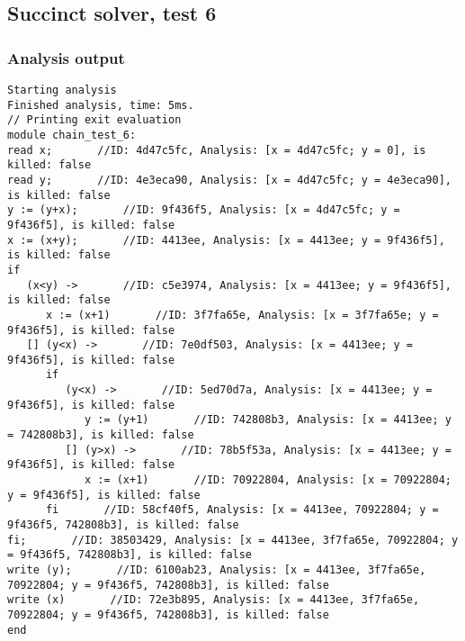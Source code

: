\documentclass{report}
\begin{document}
\subsection{Succinct solver, test 6}
\subsubsection{Analysis output}
\begin{lstlisting}
Starting analysis
Finished analysis, time: 5ms.
// Printing exit evaluation
module chain_test_6:
read x;       //ID: 4d47c5fc, Analysis: [x = 4d47c5fc; y = 0], is killed: false
read y;       //ID: 4e3eca90, Analysis: [x = 4d47c5fc; y = 4e3eca90], is killed: false
y := (y+x);       //ID: 9f436f5, Analysis: [x = 4d47c5fc; y = 9f436f5], is killed: false
x := (x+y);       //ID: 4413ee, Analysis: [x = 4413ee; y = 9f436f5], is killed: false
if
   (x<y) ->       //ID: c5e3974, Analysis: [x = 4413ee; y = 9f436f5], is killed: false
      x := (x+1)       //ID: 3f7fa65e, Analysis: [x = 3f7fa65e; y = 9f436f5], is killed: false
   [] (y<x) ->       //ID: 7e0df503, Analysis: [x = 4413ee; y = 9f436f5], is killed: false
      if
         (y<x) ->       //ID: 5ed70d7a, Analysis: [x = 4413ee; y = 9f436f5], is killed: false
            y := (y+1)       //ID: 742808b3, Analysis: [x = 4413ee; y = 742808b3], is killed: false
         [] (y>x) ->       //ID: 78b5f53a, Analysis: [x = 4413ee; y = 9f436f5], is killed: false
            x := (x+1)       //ID: 70922804, Analysis: [x = 70922804; y = 9f436f5], is killed: false
      fi       //ID: 58cf40f5, Analysis: [x = 4413ee, 70922804; y = 9f436f5, 742808b3], is killed: false
fi;       //ID: 38503429, Analysis: [x = 4413ee, 3f7fa65e, 70922804; y = 9f436f5, 742808b3], is killed: false
write (y);       //ID: 6100ab23, Analysis: [x = 4413ee, 3f7fa65e, 70922804; y = 9f436f5, 742808b3], is killed: false
write (x)       //ID: 72e3b895, Analysis: [x = 4413ee, 3f7fa65e, 70922804; y = 9f436f5, 742808b3], is killed: false
end
\end{lstlisting}
\end{document}
